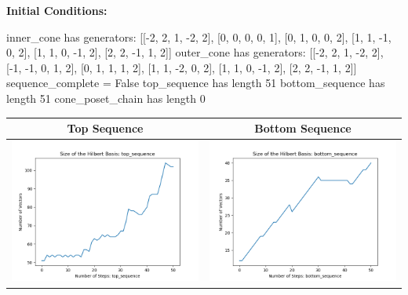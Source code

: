 \documentclass[10pt]{article}
\begin{document}
\textbf{Initial Conditions:}
\begin{SAGE}
inner_cone has generators: 
[[-2, 2, 1, -2, 2], [0, 0, 0, 0, 1], [0, 1, 0, 0, 2], [1, 1, -1, 0, 2], [1, 1, 0, -1, 2], [2, 2, -1, 1, 2]]
outer_cone has generators: 
[[-2, 2, 1, -2, 2], [-1, -1, 0, 1, 2], [0, 1, 1, 1, 2], [1, 1, -2, 0, 2], [1, 1, 0, -1, 2], [2, 2, -1, 1, 2]]
	sequence_complete = False
	top_sequence has length 51
	bottom_sequence has length 51
	cone_poset_chain has length 0

\end{SAGE}
\begin{tabular}{c|c}
\textbf{Top Sequence} & \textbf{Bottom Sequence} \\ \hline 
\begin{minipage}{.45\textwidth}
\includegraphics[width=\textwidth]{"DATA/5d/6 generators 2 bound I alternating/top_sequence SIZE"}
\end{minipage} &
\begin{minipage}{.45\textwidth}
\includegraphics[width=\textwidth]{"DATA/5d/6 generators 2 bound I alternating/bottom_sequence SIZE"}

\end{minipage}
\end{tabular}
\end{document}
